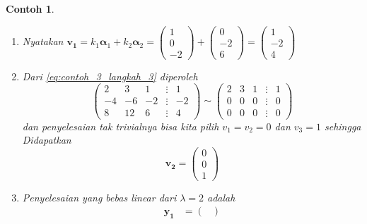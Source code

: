 \documentclass[a4paper]{article}
\theoremstyle{definisi}
\newtheorem{contoh}{Contoh}[section]
\newcommand{\bfalpha}{\boldsymbol{\alpha}}
\numberwithin{equation}{section}
\begin{document}
\begin{contoh}
\begin{enumerate}[label=Langkah \arabic*: ,leftmargin=*]
\begin{equation}
\begin{split}
          -4v_1-6v_2-2v_3&=k_2\\
          8v_1+12v_2+4v_3&=-2k_1-3k_2
        \end{split}
      \end{equation}
      mempunyai penyelesaian. Dapat ditinjau bahwa $k_1=1$ dan $k_2=-2$ memenuhi kriteria untuk \eqref{eq:contoh_3_langkah_3}.
      \item Nyatakan $\mathbf{v_1}=k_1\bfalpha_1+k_2\bfalpha_2=\begin{pmatrix}
        1\\0\\-2
      \end{pmatrix}+\begin{pmatrix}
        0\\-2\\6
      \end{pmatrix}=\begin{pmatrix}
        1\\-2\\4
      \end{pmatrix}$
      \item Dari \eqref{eq:contoh_3_langkah_3} diperoleh
      \begin{equation*}
        \begin{pmatrix}
          2&3&1&\vdots&1\\
          -4&-6&-2&\vdots&-2\\
          8&12&6&\vdots&4
        \end{pmatrix}\sim
        \begin{pmatrix}
          2&3&1&\vdots&1\\
          0&0&0&\vdots&0\\
          0&0&0&\vdots&0
        \end{pmatrix}
      \end{equation*}
      dan penyelesaian tak trivialnya bisa kita pilih $v_1=v_2=0$ dan $v_3=1$ sehingga Didapatkan
      \begin{equation*}
        \mathbf{v_2}=\begin{pmatrix}
          0\\0\\1
        \end{pmatrix}
      \end{equation*}
      \item Penyelesaian yang bebas linear dari $\lambda=2$ adalah
      \begin{align*}
        \mathbf{y_1}&=\begin{pmatrix}

\end{pmatrix}
\end{align*}
\end{enumerate}
\end{contoh}
\end{document}
